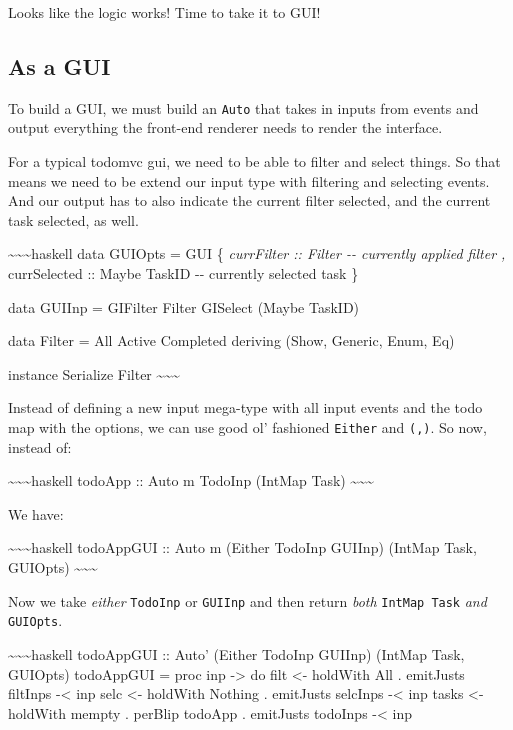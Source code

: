 \documentclass[]{article}
\begin{document}
Looks like the logic works! Time to take it to GUI!

\subsection{As a GUI}

To build a GUI, we must build an \texttt{Auto} that takes in inputs from events
and output everything the front-end renderer needs to render the interface.

For a typical todomvc gui, we need to be able to filter and select things. So
that means we need to be extend our input type with filtering and selecting
events. And our output has to also indicate the current filter selected, and the
current task selected, as well.

\textasciitilde{}\textasciitilde{}\textasciitilde{}haskell data GUIOpts = GUI \{
\emph{currFilter :: Filter -\/- currently applied filter , }currSelected ::
Maybe TaskID -\/- currently selected task \}

data GUIInp = GIFilter Filter \textbar{} GISelect (Maybe TaskID)

data Filter = All \textbar{} Active \textbar{} Completed deriving (Show,
Generic, Enum, Eq)

instance Serialize Filter \textasciitilde{}\textasciitilde{}\textasciitilde{}

Instead of defining a new input mega-type with all input events and the todo map
with the options, we can use good ol' fashioned \texttt{Either} and
\texttt{(,)}. So now, instead of:

\textasciitilde{}\textasciitilde{}\textasciitilde{}haskell todoApp :: Auto m
TodoInp (IntMap Task) \textasciitilde{}\textasciitilde{}\textasciitilde{}

We have:

\textasciitilde{}\textasciitilde{}\textasciitilde{}haskell todoAppGUI :: Auto m
(Either TodoInp GUIInp) (IntMap Task, GUIOpts)
\textasciitilde{}\textasciitilde{}\textasciitilde{}

Now we take \emph{either} \texttt{TodoInp} or \texttt{GUIInp} and then return
\emph{both} \texttt{IntMap\ Task} \emph{and} \texttt{GUIOpts}.

\textasciitilde{}\textasciitilde{}\textasciitilde{}haskell todoAppGUI :: Auto'
(Either TodoInp GUIInp) (IntMap Task, GUIOpts) todoAppGUI = proc inp
-\textgreater{} do filt \textless{}- holdWith All . emitJusts filtInps
-\textless{} inp selc \textless{}- holdWith Nothing . emitJusts selcInps
-\textless{} inp tasks \textless{}- holdWith mempty . perBlip todoApp .
emitJusts todoInps -\textless{} inp
\end{document}
